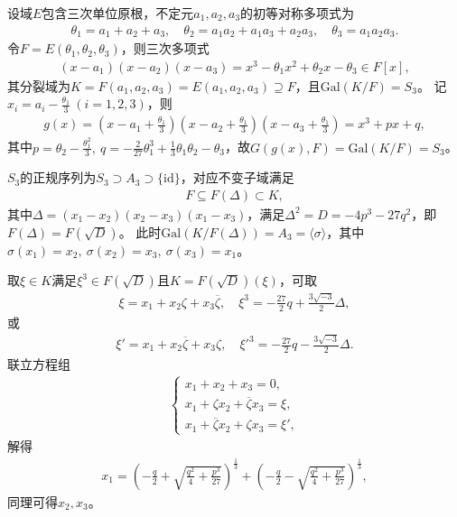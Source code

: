 \documentclass[../../main.tex]{subfiles}%
\begin{document}
\begin{example}
设域$E$包含三次单位原根，不定元$a_1,a_2,a_3$的初等对称多项式为
\begin{align*}
\theta_1=a_1+a_2+a_3,\quad \theta_2=a_1a_2+a_1a_3+a_2a_3,\quad \theta_3=a_1a_2a_3.
\end{align*}
令$F=E(\theta_1,\theta_2,\theta_3)$，则三次多项式
\begin{align*}
(x-a_1)(x-a_2)(x-a_3)=x^3-\theta_1x^2+\theta_2x-\theta_3\in F[x],
\end{align*}
其分裂域为$K=F(a_1,a_2,a_3)=E(a_1,a_2,a_3)\supseteq F$，且$\mathrm{Gal}(K/F)=S_3$。
记$x_i=a_i-\frac{\theta_1}{3}\ (i=1,2,3)$，则
\begin{align*}
g(x)=\left(x-a_1+\frac{\theta_1}{3}\right)\left(x-a_2+\frac{\theta_1}{3}\right)\left(x-a_3+\frac{\theta_1}{3}\right)=x^3+px+q,
\end{align*}
其中$p=\theta_2-\frac{\theta_1^2}{3},\ q=-\frac{2}{27}\theta_1^3+\frac{1}{3}\theta_1\theta_2-\theta_3$，故$G(g(x),F)=\mathrm{Gal}(K/F)=S_3$。

$S_3$的正规序列为$S_3\supset A_3\supset\{\mathrm{id}\}$，对应不变子域满足
\begin{align*}
F\subseteq F(\Delta)\subset K,
\end{align*}
其中$\Delta=(x_1-x_2)(x_2-x_3)(x_1-x_3)$，满足$\Delta^2=D=-4p^3-27q^2$，即$F(\Delta)=F(\sqrt{D})$。
此时$\mathrm{Gal}(K/F(\Delta))=A_3=\langle\sigma\rangle$，其中$\sigma(x_1)=x_2,\ \sigma(x_2)=x_3,\ \sigma(x_3)=x_1$。

取$\xi\in K$满足$\xi^3\in F(\sqrt{D})$且$K=F(\sqrt{D})(\xi)$，可取
\begin{align*}
\xi=x_1+x_2\zeta+x_3\overline{\zeta},\quad \xi^3=-\frac{27}{2}q+\frac{3\sqrt{-3}}{2}\Delta,
\end{align*}
或
\begin{align*}
\xi'=x_1+x_2\overline{\zeta}+x_3\zeta,\quad \xi'^3=-\frac{27}{2}q-\frac{3\sqrt{-3}}{2}\Delta.
\end{align*}
联立方程组
\begin{align*}
\begin{cases}
x_1+x_2+x_3=0,\\
x_1+\zeta x_2+\overline{\zeta}x_3=\xi,\\
x_1+\overline{\zeta}x_2+\zeta x_3=\xi',
\end{cases}
\end{align*}
解得
\begin{align*}
x_1=\left(-\frac{q}{2}+\sqrt{\frac{q^2}{4}+\frac{p^3}{27}}\right)^{\frac{1}{3}}+\left(-\frac{q}{2}-\sqrt{\frac{q^2}{4}+\frac{p^3}{27}}\right)^{\frac{1}{3}},
\end{align*}
同理可得$x_2,x_3$。
\end{example}
\end{document}
